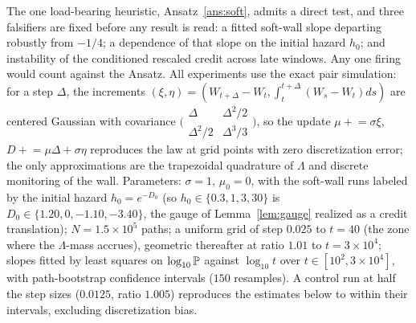 The one load-bearing heuristic, Ansatz~\ref{ans:soft}, admits a direct
test, and three falsifiers are fixed before any result is read: a
fitted soft-wall slope departing robustly from $-1/4$; a dependence of
that slope on the initial hazard $h_0$; and instability of the
conditioned rescaled credit across late windows. Any one firing would
count against the Ansatz. All experiments use the exact
pair simulation: for a step $\Delta$, the increments
$(\xi,\eta)=(W_{t+\Delta}-W_t,\int_t^{t+\Delta}(W_s-W_t)ds)$ are
centered Gaussian with covariance
$\bigl(\begin{smallmatrix}\Delta&\Delta^2/2\\
\Delta^2/2&\Delta^3/3\end{smallmatrix}\bigr)$, so the update
$\mu\mathrel{+}=\sigma\xi$, $D\mathrel{+}=\mu\Delta+\sigma\eta$
reproduces the law at grid points with zero discretization error; the
only approximations are the trapezoidal quadrature of $\Lambda$ and
discrete monitoring of the wall. Parameters: $\sigma=1$,
$\mu_0=0$, with the soft-wall runs labeled by the initial hazard
$h_0=e^{-D_0}$ (so $h_0\in\{0.3,1,3,30\}$ is $D_0\in\{1.20,0,-1.10,-3.40\}$,
the gauge of Lemma~\ref{lem:gauge} realized as a credit translation);
$N=1.5\times10^5$ paths; a uniform grid of step
$0.025$ to $t=40$ (the zone where the $\Lambda$-mass accrues),
geometric thereafter at ratio $1.01$ to $t=3\times10^4$; slopes fitted
by least squares on $\log_{10}\mathbb{P}$ against $\log_{10}t$ over
$t\in[10^2,3\times10^4]$, with path-bootstrap confidence intervals
($150$ resamples). A control run at half the step sizes
($0.0125$, ratio $1.005$) reproduces the estimates below to within
their intervals, excluding discretization bias.

